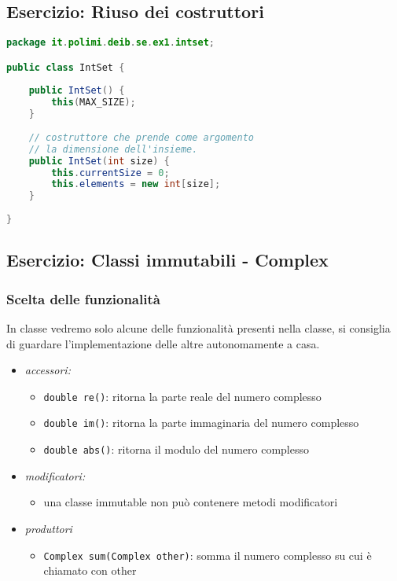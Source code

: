\documentclass{article}
\begin{document}
\subsection{Esercizio: Riuso dei costruttori}


\begin{lstlisting}[language=Java,escapechar=|]
package it.polimi.deib.se.ex1.intset;

public class IntSet {
	
	public IntSet() {
		this(MAX_SIZE);
	}
	
	// costruttore che prende come argomento
	// la dimensione dell'insieme.
	public IntSet(int size) {
		this.currentSize = 0;
		this.elements = new int[size];
	}
	
}
\end{lstlisting}

\subsection{Esercizio: Classi immutabili - Complex}


\subsubsection{Scelta delle funzionalit\`a}
In classe vedremo solo alcune delle funzionalit\`a presenti nella classe, si consiglia di guardare l'implementazione delle altre autonomamente a casa.
\begin{itemize}
\item \emph{accessori:} 
\begin{itemize}
\item \texttt{double re()}: ritorna la parte reale del numero complesso
\item \texttt{double im()}: ritorna la parte immaginaria del numero complesso
\item \texttt{double abs()}: ritorna il modulo del numero complesso
\end{itemize}
\item \emph{modificatori:}
\begin{itemize}
\item una classe immutable non pu\`o contenere metodi modificatori
\end{itemize}
\item \emph{produttori}
\begin{itemize}
\item \texttt{Complex sum(Complex other)}: somma il numero complesso su cui \`e chiamato con other
\end{itemize}
\end{itemize}
\end{document}
